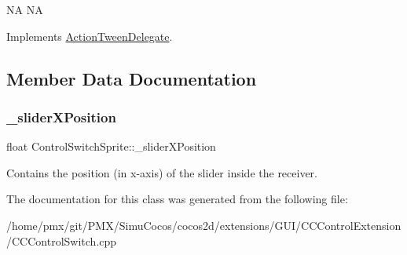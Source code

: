 NA  NA 

Implements \hyperlink{classActionTweenDelegate_a6cb6dce375e29bd38af1a81001eeac66}{Action\+Tween\+Delegate}.



\subsection{Member Data Documentation}
\mbox{\label{classControlSwitchSprite_a27b95d1b88b45a062848f0fa0101da58}} 
\subsubsection{\texorpdfstring{\+\_\+slider\+X\+Position}{\_sliderXPosition}}
{\footnotesize\ttfamily float Control\+Switch\+Sprite\+::\+\_\+slider\+X\+Position}

Contains the position (in x-\/axis) of the slider inside the receiver. 

The documentation for this class was generated from the following file\+:\begin{DoxyCompactItemize}
\item 
/home/pmx/git/\+P\+M\+X/\+Simu\+Cocos/cocos2d/extensions/\+G\+U\+I/\+C\+C\+Control\+Extension/C\+C\+Control\+Switch.\+cpp\end{DoxyCompactItemize}
